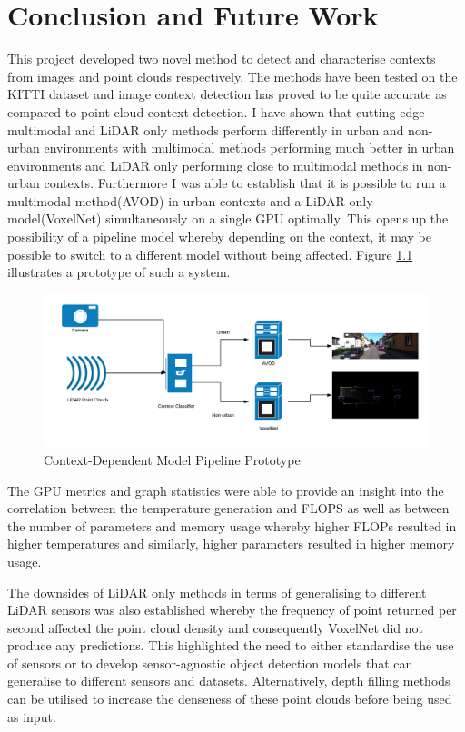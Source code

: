 %
%
\let\textcircled=\pgftextcircled
\chapter{Conclusion and Future Work}
\label{chap:fw}

This project developed two novel method to detect and characterise contexts from images and point clouds respectively. The methods have been tested on the KITTI dataset and image context detection has proved to be quite accurate as compared to point cloud context detection.
I have shown that cutting edge multimodal and LiDAR only methods perform differently in urban and non-urban environments with multimodal methods performing much better in urban environments and LiDAR only performing close to multimodal methods in non-urban contexts. Furthermore I was able to establish that it is possible to run a multimodal method(AVOD) in urban contexts and a LiDAR only model(VoxelNet) simultaneously on a single GPU optimally. 
This opens up the possibility of a pipeline model whereby depending on the context, it may be possible to switch to a different model without being affected. Figure \ref{fig:pipeline} illustrates a prototype of such a system. 
\begin{figure}[h] %
	\centering 
	\includegraphics[width=\linewidth]{images/pipeline}	
	\caption{Context-Dependent Model Pipeline Prototype}
	\label{fig:pipeline}

\end{figure}
The GPU metrics and graph statistics were able to provide an insight into the correlation between the temperature generation and FLOPS as well as between the number of parameters and memory usage whereby higher FLOPs resulted in higher temperatures and similarly, higher parameters resulted in higher memory usage. 

The downsides of LiDAR only methods in terms of generalising to different LiDAR sensors was also established whereby the frequency of point returned per second affected the point cloud density and consequently VoxelNet did not produce any predictions. This highlighted the need to either standardise the use of sensors or to develop sensor-agnostic object detection models that can generalise to different sensors and datasets. Alternatively, depth filling methods can be utilised to increase the denseness of these point clouds before being used as input\cite{depth}. 

